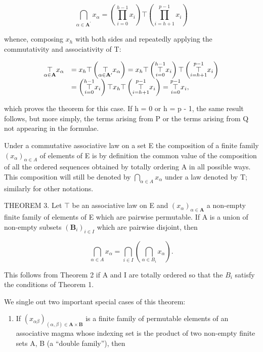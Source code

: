 \[
\bigcap_ {\alpha \in \mathbf {A} ^ {\prime}} x _ {\alpha} = \left(\prod_ {i = 0} ^ {h - 1} x _ {i}\right) \top \left(\prod_ {i = h + 1} ^ {p - 1} x _ {i}\right)
\]

whence, composing \(x_{h}\) with both sides and repeatedly applying the commutativity and associativity of T:

\[
\begin{array}{r l} \underset {\alpha \in \mathbf {A}} {\top} x _ {\alpha} & = x _ {h} \top \left(\underset {\alpha \in \mathbf {A} ^ {\prime}} {\top} x _ {\alpha}\right) = x _ {h} \top \left(\underset {i = 0} {\overset {h - 1} {\top}} x _ {i}\right) \top \left(\underset {i = h + 1} {\overset {p - 1} {\top}} x _ {i}\right) \\ & = \left(\underset {i = 0} {\overset {h - 1} {\top}} x _ {i}\right) \top x _ {h} \top \left(\underset {i = h + 1} {\overset {p - 1} {\top}} x _ {i}\right) = \underset {i = 0} {\overset {p - 1} {\top}} x _ {i}, \end{array}
\]

which proves the theorem for this case. If h = 0 or h = p - 1, the same result follows, but more simply, the terms arising from P or the terms arising from Q not appearing in the formulae.

Under a commutative associative law on a set E the composition of a finite family \((x_{\alpha})_{\alpha \in A}\) of elements of E is by definition the common value of the composition of all the ordered sequences obtained by totally ordering A in all possible ways. This composition will still be denoted by \(\bigcap_{\alpha \in A} x_{\alpha}\) under a law denoted by T; similarly for other notations.

THEOREM 3. Let \(\top\) be an associative law on E and \((x_{\alpha})_{\alpha \in \mathbf{A}}\) a non-empty finite family of elements of E which are pairwise permutable. If A is a union of non-empty subsets \((\mathbf{B}_i)_{i\in I}\) which are pairwise disjoint, then

\[
\bigcap_ {\alpha \in A} x _ {\alpha} = \bigcap_ {i \in I} \left(\bigcap_ {\alpha \in B _ {i}} x _ {\alpha}\right).\tag{6}
\]

This follows from Theorem 2 if A and I are totally ordered so that the \(B_{i}\) satisfy the conditions of Theorem 1.

We single out two important special cases of this theorem:

\begin{enumerate}
\def\labelenumi{\arabic{enumi}.}
\tightlist
\item
  If \((x_{\alpha\beta})_{(\alpha,\beta)\in\mathbf{A}\times\mathbf{B}}\) is a finite family of permutable elements of an associative magma whose indexing set is the product of two non-empty finite sets A, B (a ``double family''), then
\end{enumerate}

